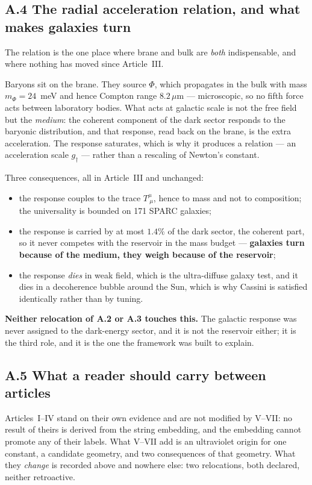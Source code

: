 \subsection*{A.4 The radial acceleration relation, and what makes galaxies turn}
The relation is the one place where brane and bulk are \emph{both} indispensable, and
where nothing has moved since Article~III.

Baryons sit on the brane. They source $\Phi$, which propagates in the bulk with mass
$m_\Phi=24$~meV and hence Compton range $8.2\,\mu$m --- microscopic, so no fifth force
acts between laboratory bodies. What acts at galactic scale is not the free field but
the \emph{medium}: the coherent component of the dark sector responds to the baryonic
distribution, and that response, read back on the brane, is the extra acceleration.
The response saturates, which is why it produces a relation --- an acceleration scale
$g_\dagger$ --- rather than a rescaling of Newton's constant.

Three consequences, all in Article~III and unchanged:
\begin{itemize}\itemsep2pt
\item the response couples to the trace $T^\mu_{\ \mu}$, hence to mass and not to
      composition; the universality is bounded on 171 SPARC galaxies;
\item the response is carried by at most $1.4\%$ of the dark sector, the coherent part,
      so it never competes with the reservoir in the mass budget --- \textbf{galaxies
      turn because of the medium, they weigh because of the reservoir};
\item the response \emph{dies} in weak field, which is the ultra-diffuse galaxy test,
      and it dies in a decoherence bubble around the Sun, which is why Cassini is
      satisfied identically rather than by tuning.
\end{itemize}
\textbf{Neither relocation of A.2 or A.3 touches this.} The galactic response was never
assigned to the dark-energy sector, and it is not the reservoir either; it is the third
role, and it is the one the framework was built to explain.

\subsection*{A.5 What a reader should carry between articles}
Articles~I--IV stand on their own evidence and are not modified by V--VII: no result of
theirs is derived from the string embedding, and the embedding cannot promote any of
their labels. What V--VII add is an ultraviolet origin for one constant, a candidate
geometry, and two consequences of that geometry. What they \emph{change} is recorded
above and nowhere else: two relocations, both declared, neither retroactive.
